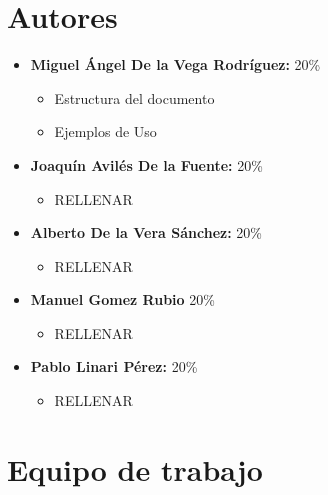 \documentclass[11pt,openany]{book}
\begin{document}
\tableofcontents %
\newpage %


\chapter{Autores}
\begin{itemize}
      \item \textbf{Miguel Ángel De la Vega Rodríguez:} 20\%
            \begin{itemize}
                  \item Estructura del documento
                  \item Ejemplos de Uso
            \end{itemize}
      \item \textbf{Joaquín Avilés De la Fuente:} 20\%
            \begin{itemize}
                  \item RELLENAR
            \end{itemize}
      \item \textbf{Alberto De la Vera Sánchez: } 20\%
            \begin{itemize}
                  \item RELLENAR
            \end{itemize}
      \item \textbf{Manuel Gomez Rubio} 20\%
            \begin{itemize}
                \item RELLENAR
            \end{itemize}
      \item \textbf{Pablo Linari Pérez:} 20\%
            \begin{itemize}
                  \item RELLENAR
            \end{itemize}
\end{itemize}

\chapter{Equipo de trabajo}
\end{document}
